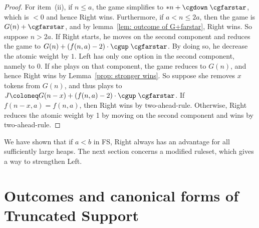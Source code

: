 \documentclass[oneside,reqno]{amsart}
\newcommand{\fs}{\mathcal{F}}
\newcommand{\rp}{\mathscr{R}}
\begin{document}
\begin{proof}
    For item~(ii), if $n\le a$, the game simplifies to $*n+\cgdown\;\cgfarstar$, which is $<0$ and hence Right wins. Furthermore, if $a<n\le 2a$, then the game is $G(n)+\cgfarstar$, and by lemma~\ref{lem: outcome of G+farstar}, Right wins. So suppose $n>2a$. If Right starts, he moves on the second component and reduces the game to $G(n)+(f(n,a)-2)\cdot\cgup\;\cgfarstar$. By doing so, he decrease the atomic weight by $1$. Left has only one option in the second component, namely to 0. If she plays on that component, the game reduces to $G(n)$, and hence Right wins by Lemma~\ref{prop: stronger wins}. So suppose she removes $x$ tokens from $G(n)$, and thus plays to $J\coloneq G(n-x)+(f(n,a)-2)\cdot\cgup\;\cgfarstar$. If $f(n-x,a)=f(n,a)$, then Right wins by two-ahead-rule. Otherwise, Right reduces the atomic weight by 1 by moving on the second component and wins by two-ahead-rule.
\end{proof}


We have shown that if $a< b$ in {\sc FS}, Right always has an advantage for all sufficiently large heaps. The next section concerns a modified ruleset, which gives a way to strengthen Left.



\section{Outcomes and canonical forms of Truncated Support}\label{sec: TS}
\end{document}
